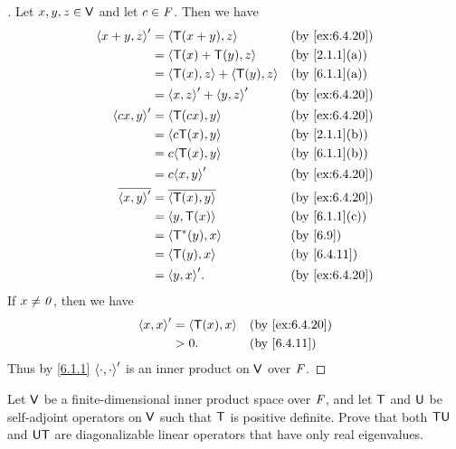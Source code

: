 \begin{proof}[]
  Let \(x, y, z \in \mathsf{V}\) and let \(c \in \mathit{F}\).
  Then we have
  \begin{align*}
    \inn{x + y, z}'    & = \inn{\T(x + y), z}              &  & \text{(by \cref{ex:6.4.20})} \\
                       & = \inn{\T(x) + \T(y), z}          &  & \text{(by \cref{2.1.1}(a))}  \\
                       & = \inn{\T(x), z} + \inn{\T(y), z} &  & \text{(by \cref{6.1.1}(a))}  \\
                       & = \inn{x, z}' + \inn{y, z}'       &  & \text{(by \cref{ex:6.4.20})} \\
    \inn{cx, y}'       & = \inn{\T(cx), y}                 &  & \text{(by \cref{ex:6.4.20})} \\
                       & = \inn{c \T(x), y}                &  & \text{(by \cref{2.1.1}(b))}  \\
                       & = c \inn{\T(x), y}                &  & \text{(by \cref{6.1.1}(b))}  \\
                       & = c \inn{x, y}'                   &  & \text{(by \cref{ex:6.4.20})} \\
    \conj{\inn{x, y}'} & = \conj{\inn{\T(x), y}}           &  & \text{(by \cref{ex:6.4.20})} \\
                       & = \inn{y, \T(x)}                  &  & \text{(by \cref{6.1.1}(c))}  \\
                       & = \inn{\T^*(y), x}                &  & \text{(by \cref{6.9})}       \\
                       & = \inn{\T(y), x}                  &  & \text{(by \cref{6.4.11})}    \\
                       & = \inn{y, x}'.                    &  & \text{(by \cref{ex:6.4.20})}
  \end{align*}
  If \(x \neq \mathit{0}\), then we have
  \begin{align*}
    \inn{x, x}' & = \inn{\T(x), x} &  & \text{(by \cref{ex:6.4.20})} \\
                & > 0.             &  & \text{(by \cref{6.4.11})}
  \end{align*}
  Thus by \cref{6.1.1} \(\left\langle\cdot, \cdot\right\rangle'\) is an inner product on \(\mathsf{V}\) over \(\mathit{F}\).
\end{proof}

\begin{ex}\label{ex:6.4.21}
  Let \(\mathsf{V}\) be a finite-dimensional inner product space over \(\mathit{F}\), and let \(\mathsf{T}\) and \(\mathsf{U}\) be self-adjoint operators on \(\mathsf{V}\) such that \(\mathsf{T}\) is positive definite.
  Prove that both \(\mathsf{T} \mathsf{U}\) and \(\mathsf{U} \mathsf{T}\) are diagonalizable linear operators that have only real eigenvalues.
\end{ex}

